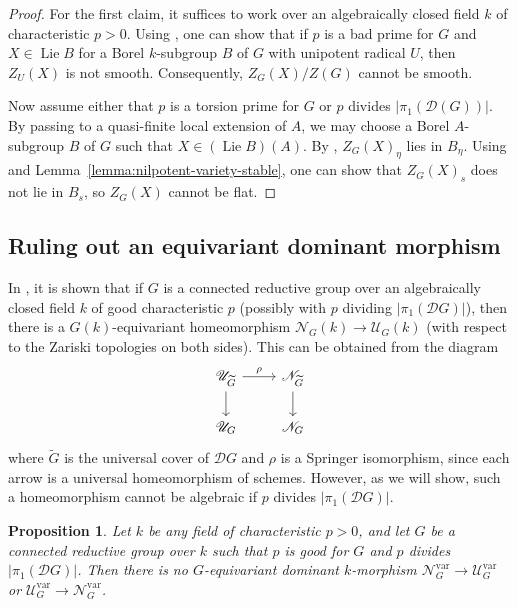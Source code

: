\documentclass[11pt,reqno]{amsart}
\newtheorem{prop}[theorem]{Proposition}
\theoremstyle{definition}
\renewcommand{\rm}{\mathrm}
\newcommand{\sD}{{\mathscr D}}
\newcommand{\sN}{{\mathscr N}}
\newcommand{\sU}{{\mathscr U}}
\DeclareMathOperator{\Lie}{Lie}
\begin{document}
\begin{proof}
For the first claim, it suffices to work over an algebraically closed field $k$ of characteristic $p > 0$. Using \cite[Theorem 2.6]{Springer}, one can show that if $p$ is a bad prime for $G$ and $X \in \Lie B$ for a Borel $k$-subgroup $B$ of $G$ with unipotent radical $U$, then $Z_U(X)$ is not smooth. Consequently, $Z_G(X)/Z(G)$ cannot be smooth. 

Now assume either that $p$ is a torsion prime for $G$ or $p$ divides $|\pi_1(\sD(G))|$. By passing to a quasi-finite local extension of $A$, we may choose a Borel $A$-subgroup $B$ of $G$ such that $X \in (\Lie B)(A)$. By \cite[Proposition 3.8]{Integral-Springer}, $Z_G(X)_\eta$ lies in $B_\eta$. Using \cite[Proposition 2.4, Theorem 2.6]{Springer} and Lemma~\ref{lemma:nilpotent-variety-stable}, one can show that $Z_G(X)_s$ does not lie in $B_s$, so $Z_G(X)$ cannot be flat.
\end{proof}












\subsection{Ruling out an equivariant dominant morphism}\label{subsection:no-springer-homeomorphism}

In \cite[Proposition 29]{Mcninch-subprincipal}, it is shown that if $G$ is a connected reductive group over an algebraically closed field $k$ of good characteristic $p$ (possibly with $p$ dividing $|\pi_1(\sD G)|$), then there is a $G(k)$-equivariant homeomorphism $\sN_G(k) \to \sU_G(k)$ (with respect to the Zariski topologies on both sides). This can be obtained from the diagram
\[
\begin{tikzcd}
\sU_{\widetilde{G}} \arrow[r, "\rho"] \arrow[d]
    &\sN_{\widetilde{G}} \arrow[d] \\
\sU_G
    &\sN_G
\end{tikzcd}
\]
where $\widetilde{G}$ is the universal cover of $\sD G$ and $\rho$ is a Springer isomorphism, since each arrow is a universal homeomorphism of schemes. However, as we will show, such a homeomorphism cannot be algebraic if $p$ divides $|\pi_1(\sD G)|$.

\begin{prop}\label{prop:no-dominant-map}
    Let $k$ be any field of characteristic $p > 0$, and let $G$ be a connected reductive group over $k$ such that $p$ is good for $G$ and $p$ divides $|\pi_1(\sD G)|$. Then there is no $G$-equivariant dominant $k$-morphism $\sN_G^{\rm{var}} \to \sU_G^{\rm{var}}$ or $\sU_G^{\rm{var}} \to \sN_G^{\rm{var}}$.
\end{prop}
\end{document}
